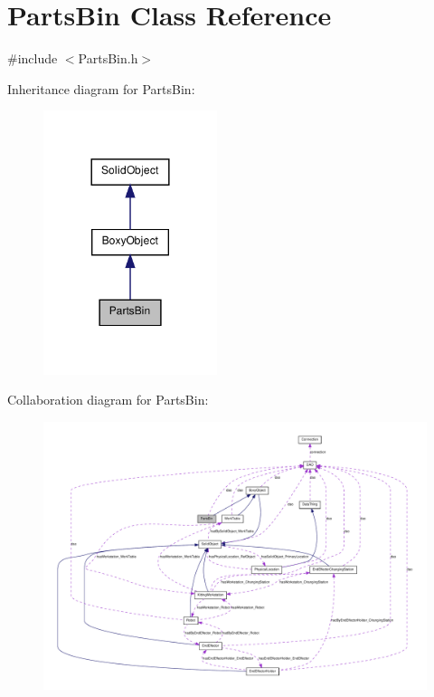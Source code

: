 \hypertarget{class_parts_bin}{
\section{PartsBin Class Reference}
\label{class_parts_bin}
}


{\ttfamily \#include $<$PartsBin.h$>$}



Inheritance diagram for PartsBin:\nopagebreak
\begin{figure}[H]
\begin{center}
\leavevmode
\includegraphics[width=144pt]{class_parts_bin__inherit__graph}
\end{center}
\end{figure}


Collaboration diagram for PartsBin:\nopagebreak
\begin{figure}[H]
\begin{center}
\leavevmode
\includegraphics[width=400pt]{class_parts_bin__coll__graph}
\end{center}
\end{figure}
